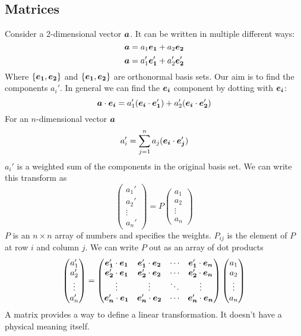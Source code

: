 \documentclass{article}
\begin{document}
    \subsection{Matrices}
    Consider a 2-dimensional vector \(\bm{a}\). It can be written in multiple different ways:
    \[\bm{a} = a_1\bm{e_{1}} + a_2\bm{e_{2}}\]
    \[\bm{a} = a_1'\bm{e_{1}}' + a_2'\bm{e_{2}}'\]
    Where \(\{\bm{e_{1}}, \bm{e_{2}}\}\) and \(\{\bm{e_{1}}, \bm{e_{2}}\}\) are orthonormal basis sets.
    Our aim is to find the components \(a_i'\).
    In general we can find the \(\bm{e_{i}}\) component by dotting with \(\bm{e_{i}}\):
    \[\bm{a}\cdot\bm{e_{i}} = a_1'(\bm{e_{i}}\cdot\bm{e_{1}}') + a_2'(\bm{e_{i}}\cdot\bm{e_{2}}')\]
    For an \(n\)-dimensional vector \(\bm{a}\)
    \[a_i' = \sum_{j = 1}^{n}a_j(\bm{e_{i}}\cdot\bm{e_{j}}')\]
    \(a_i'\) is a weighted sum of the components in the original basis set. We can write this transform as
    \[
        \begin{pmatrix}
            a_1' \\ a_2' \\ \vdots \\ a_n'
        \end{pmatrix}
        = P
        \begin{pmatrix}
            a_1 \\ a_2 \\ \vdots \\ a_n
        \end{pmatrix}
    \]
    \(P\) is an \(n\times n\) array of numbers and specifies the weights. \(P_{ij}\) is the element of \(P\) at row \(i\) and column \(j\).
    We can write \(P\) out as an array of dot products
    \[
        \begin{pmatrix}
            a_1' \\ a_2' \\ \vdots \\ a_n'
        \end{pmatrix}
        =
        \begin{pmatrix}
            \bm{e_{1}}'\cdot \bm{e_{1}} & \bm{e_{1}}'\cdot \bm{e_{2}} & \cdots & \bm{e_{1}}'\cdot \bm{e_{n}}\\
            \bm{e_{2}}'\cdot \bm{e_{1}} & \bm{e_{2}}'\cdot \bm{e_{2}} & \cdots & \bm{e_{2}}'\cdot \bm{e_{n}}\\
            \vdots & \vdots & \ddots & \vdots\\
            \bm{e_{n}}'\cdot \bm{e_{1}} & \bm{e_{n}}'\cdot \bm{e_{2}} & \cdots & \bm{e_{n}}'\cdot \bm{e_{n}}
        \end{pmatrix}
        \begin{pmatrix}
            a_1 \\ a_2 \\ \vdots \\ a_n
        \end{pmatrix}
    \]
    A matrix provides a way to define a linear transformation. 
    It doesn't have a physical meaning itself.
    
\end{document}
